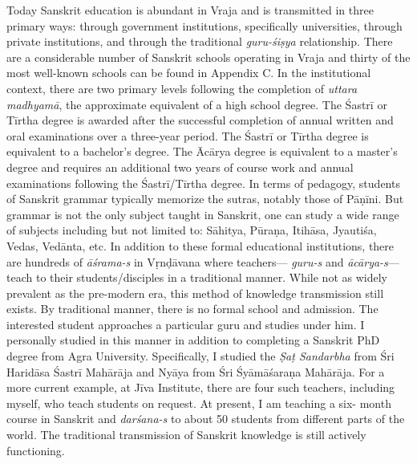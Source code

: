 Today Sanskrit education is abundant in Vraja and is transmitted in three primary ways: through government institutions, specifically universities, through private institutions, and through the traditional {\sl guru-śiṣya} relationship. There are a considerable number of Sanskrit schools operating in Vraja and thirty of the most well-known schools can be found in Appendix C. In the institutional context, there are two primary levels following the completion of {\sl uttara madhyamā}, the approximate equivalent of a high school degree. The Śastrī or Tīrtha degree is awarded after the successful completion of annual written and oral examinations over a three-year period. The Śastrī or Tīrtha degree is equivalent to a bachelor’s degree. The Ācārya degree is equivalent to a master’s degree and requires an additional two years of course work and annual examinations following the Śastrī/Tīrtha degree. In terms of pedagogy, students of Sanskrit grammar typically memorize the sutras, notably those of Pāṇīni. But grammar is not the only subject taught in Sanskrit, one can study a wide range of subjects including but not limited to: Sāhitya, Pūraṇa, Itihāsa, Jyautiśa, Vedas, Vedānta, etc. In addition to these formal educational institutions, there are hundreds of {\sl āśrama-s} in Vṛnḍāvana where teachers— {\sl guru-s} and {\sl ācārya-s}— teach to their students/disciples in a traditional manner. While not as widely prevalent as the pre-modern era, this method of knowledge transmission still exists. By traditional manner, there is no formal school and admission. The interested student approaches a particular guru and studies under him. I personally studied in this manner in addition to completing a Sanskrit PhD degree from Agra University. Specifically, I studied the {\sl Ṣaṭ Sandarbha} from Śri Haridāsa Śastrī Mahārāja and Nyāya from Śri Śyāmāśaraṇa Mahārāja. For a more current example, at Jīva Institute, there are four such teachers, including myself, who teach students on request. At present, I am teaching a six- month course in Sanskrit and {\sl darśana-s} to about 50 students from different parts of the world. The traditional transmission of Sanskrit knowledge is still actively functioning. 

